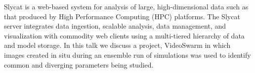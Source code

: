 \license


Slycat is a web-based system for analysis of large, high-dimensional data such as that produced by High Performance Computing (HPC) platforms. The Slycat server integrates data ingestion, scalable analysis, data management, and visualization with commodity web clients using a multi-tiered hierarchy of data and model storage. In this talk we discuss a project, VideoSwarm in which images created in situ during an ensemble run of simulations was used to identify common and diverging parameters being studied.

